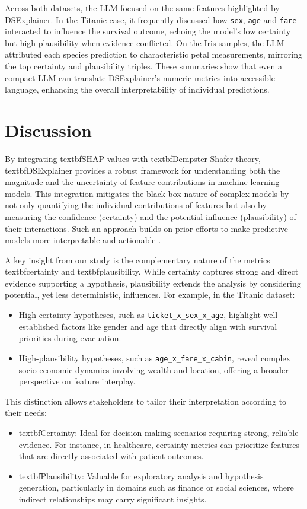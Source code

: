 \documentclass[acmlarge]{acmart}
\begin{document}
Across both datasets, the LLM focused on the same features highlighted by DSExplainer. In the Titanic case, it frequently discussed how \texttt{sex}, \texttt{age} and \texttt{fare} interacted to influence the survival outcome, echoing the model's low certainty but high plausibility when evidence conflicted. On the Iris samples, the LLM attributed each species prediction to characteristic petal measurements, mirroring the top certainty and plausibility triples. These summaries show that even a compact LLM can translate DSExplainer's numeric metrics into accessible language, enhancing the overall interpretability of individual predictions.


\section{Discussion}
\label{sec:discussion}

By integrating textbf{SHAP values} with textbf{Dempster-Shafer theory}, textbf{DSExplainer} provides a robust framework for understanding both the magnitude and the uncertainty of feature contributions in machine learning models. This integration mitigates the black-box nature of complex models by not only quantifying the individual contributions of features but also by measuring the confidence (certainty) and the potential influence (plausibility) of their interactions. Such an approach builds on prior efforts to make predictive models more interpretable and actionable \cite{lundberg2017unified, zhang2021evidential}.

A key insight from our study is the complementary nature of the metrics textbf{certainty} and textbf{plausibility}. While certainty captures strong and direct evidence supporting a hypothesis, plausibility extends the analysis by considering potential, yet less deterministic, influences. For example, in the Titanic dataset:
\begin{itemize}
    \item High-certainty hypotheses, such as \texttt{ticket_x_sex_x_age}, highlight well-established factors like gender and age that directly align with survival priorities during evacuation.

    \item High-plausibility hypotheses, such as \texttt{age\_x\_fare\_x\_cabin}, reveal complex socio-economic dynamics involving wealth and location, offering a broader perspective on feature interplay.
\end{itemize}

This distinction allows stakeholders to tailor their interpretation according to their needs:
\begin{itemize}
    \item textbf{Certainty:} Ideal for decision-making scenarios requiring strong, reliable evidence. For instance, in healthcare, certainty metrics can prioritize features that are directly associated with patient outcomes.
    \item textbf{Plausibility:} Valuable for exploratory analysis and hypothesis generation, particularly in domains such as finance or social sciences, where indirect relationships may carry significant insights.
\end{itemize}
\end{document}
